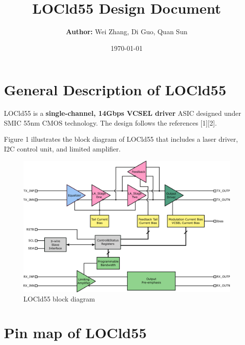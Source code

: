 \documentclass[15pt,a4paper]{article}
\title{\textbf{LOCld55 Design Document}}
\author{\textbf{Author:} Wei Zhang, Di Guo, Quan Sun}
\date{\today}
\begin{document}
\begin{spacing}{1.25}           %
\maketitle

\thispagestyle{empty}           %

\newpage

\tableofcontents                %

\thispagestyle{empty}           %

\newpage

\setcounter{page}{1}

\section{General Description of LOCld55}    %

LOCld55 is a \textbf{single-channel, 14Gbps VCSEL driver} ASIC designed under SMIC 55nm CMOS technology. The design follows the references [1][2].

Figure 1 illustrates the block diagram of LOCld55 that includes a laser driver, I2C control unit, and limited amplifier.

\begin{figure}[H]
    \includegraphics[width=\linewidth]{./Img/locld55.png}
    \caption{LOCld55 block diagram}
\end{figure}

\section{Pin map of LOCld55}                %


\end{spacing}
\end{document}

